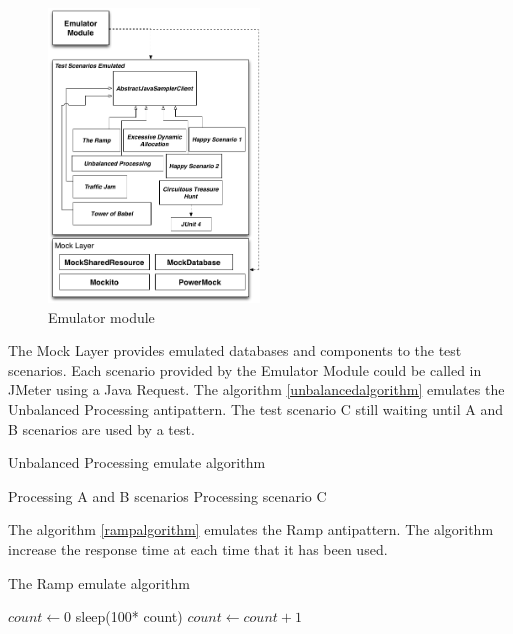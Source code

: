 \documentclass[times]{stvrauth}
\begin{document}
\begin{figure}[h]
\centering
\includegraphics[width=0.5\textwidth]{./images/emulator.png}
\caption{Emulator module}
\label{fig:emulator}
\end{figure}  

The Mock Layer provides emulated databases and components to the test scenarios. Each scenario provided by the Emulator Module could be called in JMeter using a Java Request. The algorithm \ref{unbalancedalgorithm} emulates the Unbalanced Processing antipattern. The test scenario C still waiting until A and B scenarios are used by a test.

\begin{algorithm}[H]
  \caption{Unbalanced Processing emulate algorithm}\label{unbalancedalgorithm}
  \begin{algorithmic}[1]
    
    \State Processing A and B scenarios
    \EndWhile
    \State Processing scenario C
      
  \end{algorithmic}
\end{algorithm}

The algorithm \ref{rampalgorithm} emulates  the Ramp antipattern. The algorithm increase the response time at each  time that it has been used.

\begin{algorithm}[H]
  \caption{The Ramp emulate algorithm}\label{rampalgorithm}
  \begin{algorithmic}[1]
    \State $count \gets 0  $
    \EndIf
    \State sleep(100* count)
    \State $count \gets count +1  $     
  \end{algorithmic}
\end{algorithm}
\end{document}
